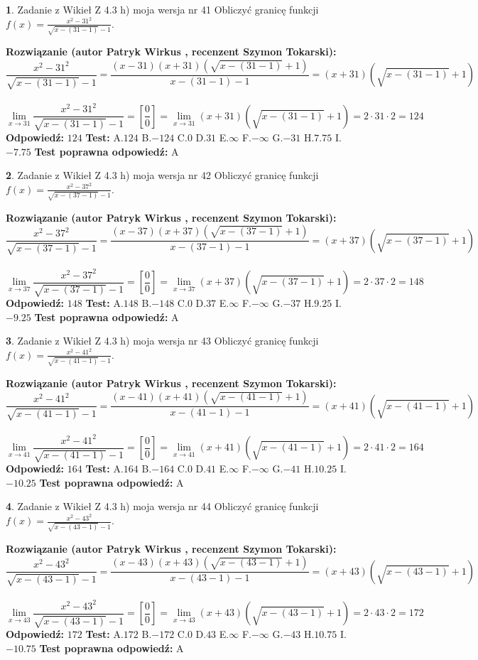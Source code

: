 \documentclass[12pt, a4paper]{article}
\theoremstyle{definition} %
\newtheorem{zad}{}
\newcommand{\zadStart}[1]{\begin{zad}#1\newline}
\newcommand{\zadStop}{\end{zad}}
\newcommand{\rozwStart}[2]{\noindent \textbf{Rozwiązanie (autor #1 , recenzent #2): }\newline}
\newcommand{\rozwStop}{\newline}
\newcommand{\odpStart}{\noindent \textbf{Odpowiedź:}\newline}
\newcommand{\odpStop}{\newline}
\newcommand{\testStart}{\noindent \textbf{Test:}\newline}
\newcommand{\testStop}{\newline}
\newcommand{\kluczStart}{\noindent \textbf{Test poprawna odpowiedź:}\newline}
\newcommand{\kluczStop}{\newline}
\begin{document}
\zadStart{Zadanie z Wikieł Z 4.3 h) moja wersja nr 41}
Obliczyć granicę funkcji $f(x)=\frac{x^{2} - 31^{2}}{\sqrt{x-(31-1)}-1}$.
\zadStop
\rozwStart{Patryk Wirkus}{Szymon Tokarski}
$$\frac{x^{2} - 31^{2}}{\sqrt{x-(31-1)}-1}=\frac{(x-31)(x+31)(\sqrt{x-(31-1)}+1)}{x-(31-1)-1}=(x+31)(\sqrt{x-(31-1)}+1)$$
\\
$$\lim\limits_{x\to 31}\frac{x^{2} - 31^{2}}{\sqrt{x-(31-1)}-1}=[\frac{0}{0}]=
\lim\limits_{x\to 31}(x+31)(\sqrt{x-(31-1)}+1) = 2\cdot31 \cdot 2 = 124$$
\rozwStop
\odpStart
$124$
\odpStop
\testStart
A.$124$
B.$-124$
C.$0$
D.$31$
E.$\infty$
F.$-\infty$
G.$-31$
H.$7.75$
I.$-7.75$
\testStop
\kluczStart
A
\kluczStop



\zadStart{Zadanie z Wikieł Z 4.3 h) moja wersja nr 42}
Obliczyć granicę funkcji $f(x)=\frac{x^{2} - 37^{2}}{\sqrt{x-(37-1)}-1}$.
\zadStop
\rozwStart{Patryk Wirkus}{Szymon Tokarski}
$$\frac{x^{2} - 37^{2}}{\sqrt{x-(37-1)}-1}=\frac{(x-37)(x+37)(\sqrt{x-(37-1)}+1)}{x-(37-1)-1}=(x+37)(\sqrt{x-(37-1)}+1)$$
\\
$$\lim\limits_{x\to 37}\frac{x^{2} - 37^{2}}{\sqrt{x-(37-1)}-1}=[\frac{0}{0}]=
\lim\limits_{x\to 37}(x+37)(\sqrt{x-(37-1)}+1) = 2\cdot37 \cdot 2 = 148$$
\rozwStop
\odpStart
$148$
\odpStop
\testStart
A.$148$
B.$-148$
C.$0$
D.$37$
E.$\infty$
F.$-\infty$
G.$-37$
H.$9.25$
I.$-9.25$
\testStop
\kluczStart
A
\kluczStop



\zadStart{Zadanie z Wikieł Z 4.3 h) moja wersja nr 43}
Obliczyć granicę funkcji $f(x)=\frac{x^{2} - 41^{2}}{\sqrt{x-(41-1)}-1}$.
\zadStop
\rozwStart{Patryk Wirkus}{Szymon Tokarski}
$$\frac{x^{2} - 41^{2}}{\sqrt{x-(41-1)}-1}=\frac{(x-41)(x+41)(\sqrt{x-(41-1)}+1)}{x-(41-1)-1}=(x+41)(\sqrt{x-(41-1)}+1)$$
\\
$$\lim\limits_{x\to 41}\frac{x^{2} - 41^{2}}{\sqrt{x-(41-1)}-1}=[\frac{0}{0}]=
\lim\limits_{x\to 41}(x+41)(\sqrt{x-(41-1)}+1) = 2\cdot41 \cdot 2 = 164$$
\rozwStop
\odpStart
$164$
\odpStop
\testStart
A.$164$
B.$-164$
C.$0$
D.$41$
E.$\infty$
F.$-\infty$
G.$-41$
H.$10.25$
I.$-10.25$
\testStop
\kluczStart
A
\kluczStop



\zadStart{Zadanie z Wikieł Z 4.3 h) moja wersja nr 44}
Obliczyć granicę funkcji $f(x)=\frac{x^{2} - 43^{2}}{\sqrt{x-(43-1)}-1}$.
\zadStop
\rozwStart{Patryk Wirkus}{Szymon Tokarski}
$$\frac{x^{2} - 43^{2}}{\sqrt{x-(43-1)}-1}=\frac{(x-43)(x+43)(\sqrt{x-(43-1)}+1)}{x-(43-1)-1}=(x+43)(\sqrt{x-(43-1)}+1)$$
\\
$$\lim\limits_{x\to 43}\frac{x^{2} - 43^{2}}{\sqrt{x-(43-1)}-1}=[\frac{0}{0}]=
\lim\limits_{x\to 43}(x+43)(\sqrt{x-(43-1)}+1) = 2\cdot43 \cdot 2 = 172$$
\rozwStop
\odpStart
$172$
\odpStop
\testStart
A.$172$
B.$-172$
C.$0$
D.$43$
E.$\infty$
F.$-\infty$
G.$-43$
H.$10.75$
I.$-10.75$
\testStop
\kluczStart
A
\kluczStop
\end{document}
